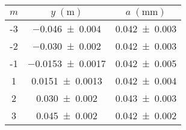 \begin{tabular}{cc|c}
\toprule
$m$ &      $y \; (\si{\m})$ &  $a \; (\si{\mm})$ \\
\midrule
 -3 &   \num{-0.046+-0.004} & \num{0.042+-0.003} \\
 -2 &   \num{-0.030+-0.002} & \num{0.042+-0.003} \\
 -1 & \num{-0.0153+-0.0017} & \num{0.042+-0.005} \\
  1 &  \num{0.0151+-0.0013} & \num{0.042+-0.004} \\
  2 &    \num{0.030+-0.002} & \num{0.043+-0.003} \\
  3 &    \num{0.045+-0.002} & \num{0.042+-0.002} \\
\bottomrule
\end{tabular}
